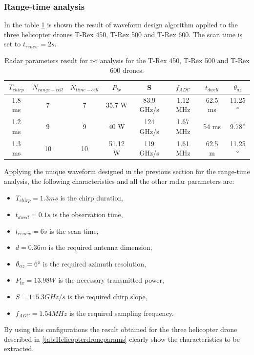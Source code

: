 \subsubsection{Range-time analysis}
In the table \ref{tab:rt-helic-result}  is shown the result of waveform design algorithm applied to the three helicopter drones T-Rex 450, T-Rex 500 and T-Rex 600. The scan time is set to $t_{renew} = 2s$. 
\begin{table}[h!]
\centering
\begin{tabular}{|c|c|c|c|c|c|c|c|}
\hline
$T_{chirp}$ & $N_{range-cell}$ & $N_{time-cell}$ & $P_{tx}$ & S & $f_{ADC}$ & $t_{dwell}$ & $\theta_{az}$ \\ \hline
1.8 ms & 7 & 7 & 35.7 W & 83.9 GHz/s & 1.12 MHz & 62.5 ms & 11.25$\degree$ \\ \hline
1.2 ms & 9 & 9 & 40 W & 124 GHz/s & 1.67 MHz & 54 ms & 9.78$\degree$ \\ \hline
1.3 ms & 10 & 10 & 51.12 W & 119 GHz/s & 1.61 MHz & 62.5 m & 11.25$\degree$ \\ \hline
\end{tabular}
\caption{Radar parameters result for r-t analysis for the T-Rex 450, T-Rex 500 and T-Rex 600 drones.}
\label{tab:rt-helic-result}
\end{table}
Applying the unique waveform designed in the previous section for the range-time analysis, the following characteristics and all the other radar parameters are:
\begin{itemize}

    \item $T_{chirp} = 1.3ms$ is the chirp duration,
    
    \item $t_{dwell} = 0.1s$ is the observation time,
    
    \item $t_{renew} = 6 s$ is the scan time,

    \item $d = 0.36 m$ is the required antenna dimension,
         
    \item $\theta_{az} = 6\degree$ is the required azimuth resolution,

    \item $P_{tx} = 13.98 W$ is the necessary transmitted power,
    
    \item $S = 115.3 GHz/s$ is the required chirp slope,
    
    \item $f_{ADC} = 1.54 MHz$ is the required sampling frequency.
    
\end{itemize}
By using this configurations the result obtained for the three helicopter drone described in \ref{tab:Helicopterdroneparams} clearly show the characteristics to be extracted.

